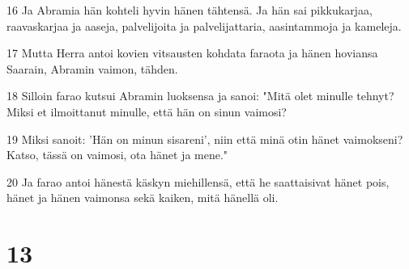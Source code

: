 \par 16 Ja Abramia hän kohteli hyvin hänen tähtensä. Ja hän sai pikkukarjaa, raavaskarjaa ja aaseja, palvelijoita ja palvelijattaria, aasintammoja ja kameleja.
\par 17 Mutta Herra antoi kovien vitsausten kohdata faraota ja hänen hoviansa Saarain, Abramin vaimon, tähden.
\par 18 Silloin farao kutsui Abramin luoksensa ja sanoi: "Mitä olet minulle tehnyt? Miksi et ilmoittanut minulle, että hän on sinun vaimosi?
\par 19 Miksi sanoit: 'Hän on minun sisareni', niin että minä otin hänet vaimokseni? Katso, tässä on vaimosi, ota hänet ja mene."
\par 20 Ja farao antoi hänestä käskyn miehillensä, että he saattaisivat hänet pois, hänet ja hänen vaimonsa sekä kaiken, mitä hänellä oli.

\chapter{13}

